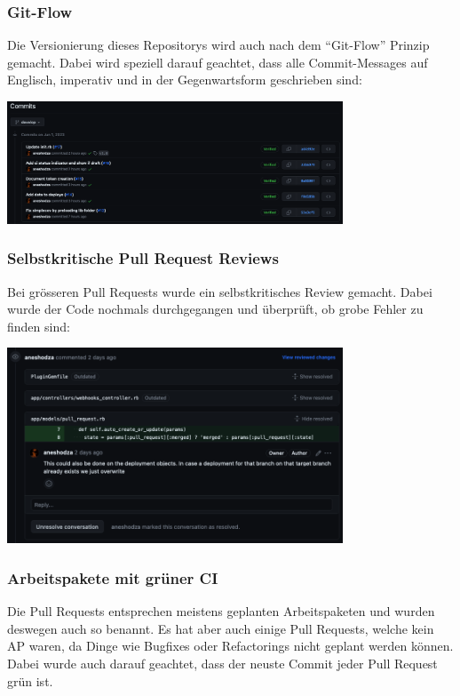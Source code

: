\subsubsection{Git-Flow}
Die Versionierung dieses Repositorys wird auch nach dem \enquote{Git-Flow} Prinzip gemacht. Dabei wird
speziell darauf geachtet, dass alle Commit-Messages auf Englisch, imperativ und in der Gegenwartsform
geschrieben sind: 
\begin{center}
    \includegraphics[width=0.75\textwidth]{images/misc/git_commit_message.png}
    \label{fig:git_commit_message}
\end{center}
\subsubsection{Selbstkritische Pull Request Reviews}
Bei grösseren Pull Requests wurde ein selbstkritisches Review gemacht. Dabei wurde der Code nochmals
durchgegangen und überprüft, ob grobe Fehler zu finden sind:
\begin{center}
    \includegraphics[width=0.75\textwidth]{images/misc/git_pr_review.png}
    \label{fig:git_pr_review}
\end{center}
\subsubsection{Arbeitspakete mit \gls{grün}er CI}
Die Pull Requests entsprechen meistens geplanten Arbeitspaketen und wurden deswegen auch so benannt. Es hat
aber auch einige Pull Requests, welche kein AP waren, da Dinge wie Bugfixes oder Refactorings nicht geplant
werden können. \newline
Dabei wurde auch darauf geachtet, dass der neuste Commit jeder Pull Request grün ist.

